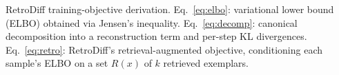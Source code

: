 \caption{RetroDiff training-objective derivation. Eq.~\eqref{eq:elbo}: variational lower bound (ELBO) obtained via Jensen's inequality. Eq.~\eqref{eq:decomp}: canonical decomposition into a reconstruction term and per-step KL divergences. Eq.~\eqref{eq:retro}: RetroDiff's retrieval-augmented objective, conditioning each sample's ELBO on a set $R(x)$ of $k$ retrieved exemplars.}
